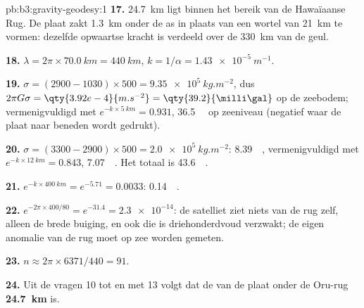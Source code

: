 \begin{solution}{pb:b3:gravity-geodesy:1}
\textbf{17.} \qty{24.7}{km} ligt binnen het bereik van de Hawaïaanse Rug. De
plaat zakt \qty{1.3}{km} onder de as in plaats van een wortel van
\qty{21}{km} te vormen: dezelfde opwaartse kracht is verdeeld over de \qty{330}{km} van de geul.

\textbf{18.} $\lambda = 2\pi\times\qty{70.0}{km} = \qty{440}{km}$,
$k = 1/\alpha = \qty{1.43e-5}{m^{-1}}$.

\textbf{19.} $\sigma = (2900 - 1030)\times500 = \qty{9.35e5}{kg.m^{-2}}$, dus
$2\pi G\sigma = \qty{3.92e-4}{m.s^{-2}} = \qty{39.2}{\milli\gal}$ op de zeebodem;
vermenigvuldigd met $e^{-k\times\qty{5}{km}} = 0.931$, \qty{36.5}{\milli\gal} op zeeniveau
(negatief waar de plaat naar beneden wordt gedrukt).

\textbf{20.} $\sigma = (3300 - 2900)\times500 = \qty{2.0e5}{kg.m^{-2}}$:
\qty{8.39}{\milli\gal}, vermenigvuldigd met $e^{-k\times\qty{12}{km}} = 0.843$,
\qty{7.07}{\milli\gal}. Het totaal is \qty{43.6}{\milli\gal}.

\textbf{21.} $e^{-k\times\qty{400}{km}} = e^{-5.71} = 0.0033$: \qty{0.14}{\milli\gal}.

\textbf{22.} $e^{-2\pi\times400/80} = e^{-31.4} = \num{2.3e-14}$: de satelliet
ziet niets van de rug zelf, alleen de brede buiging, en ook die is
driehonderdvoud verzwakt; de eigen anomalie van de rug moet op zee worden gemeten.

\textbf{23.} $n \approx 2\pi\times6371/440 = 91$.

\textbf{24.} Uit de vragen 10 tot en met 13 volgt dat de  van de
plaat onder de Oru-rug
\textbf{\qty[text-series-to-math=true]{24.7}{km}} is.
\end{solution}
